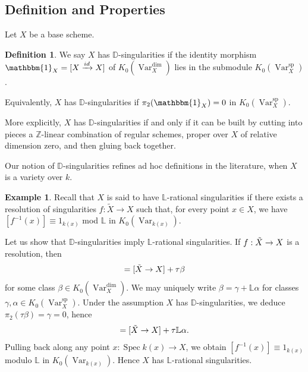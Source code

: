 \documentclass{amsart}
\theoremstyle{definition}
\newtheorem{defn}[thm]{Definition}
\newtheorem{exmp}[thm]{Example}
\DeclareMathOperator{\Var}{Var}
\DeclareMathOperator{\spr}{sp}
\newcommand{\KdimX}{K_0(\Var_X^{\dim})}
\newcommand{\KsprX}{K_0(\Var_X^{\spr})}
\numberwithin{equation}{section}
\begin{document}
\subsection{Definition and Properties}
Let $X$ be a base scheme.
\begin{defn}
We say $X$ has $\mathbb{D}$-singularities if the identity morphism $\mathbbm{1}_X = [X \xrightarrow[]{id} X]$ of $\KdimX$ lies in the submodule $\KsprX$.
\end{defn}

Equivalently, $X$ has $\mathbb{D}$-singularities if $\pi_2(\mathbbm{1}_X) = 0$ in $\KsprX$. 

More explicitly, $X$ has $\mathbb{D}$-singularities if and only if it can be built by cutting into pieces a $\mathbb{Z}$-linear combination of regular schemes, proper over $X$ of relative dimension zero, and then gluing back together.

Our notion of $\mathbb{D}$-singularities refines ad hoc definitions in the literature, when $X$ is a variety over $k$.

\begin{exmp}\label{L exmp}
Recall that $X$ is said to have $\mathbb{L}$-rational singularities \cite{stablebirational} if there exists a resolution of singularities $f: \tilde{X} \rightarrow X$ such that, for every point $x \in X$, we have $[f^{-1}(x)] \equiv 1_{k(x)}$ mod $\mathbb{L}$ in $K_0(\Var_{k(x)})$. 

Let us show that $\mathbb{D}$-singularities imply $\mathbb{L}$-rational singularities. If $f: \Tilde{X} \rightarrow X$ is a resolution, then
\begin{align*}
    [X \rightarrow X] = [\Tilde{X} \rightarrow X] + \tau \beta
\end{align*}
for some class $\beta \in \KdimX$. We may uniquely write $\beta = \gamma+\mathbb{L} \alpha$ for classes $\gamma, \alpha \in \KsprX$. Under the assumption $X$ has $\mathbb{D}$-singularities, we deduce $\pi_2(\tau \beta) = \gamma= 0$, hence 
\begin{align*}
    [X \rightarrow X] = [\Tilde{X} \rightarrow X] + \tau \mathbb{L} \alpha.
\end{align*}
Pulling back along any point $x: \mathop{\mathrm{Spec}}k(x) \rightarrow X$, we obtain $[f^{-1}(x)] \equiv 1_{k(x)}$ modulo $\mathbb{L}$ in $K_0(\Var_{k(x)})$. Hence $X$ has $\mathbb{L}$-rational singularities.
\end{exmp}
\end{document}
